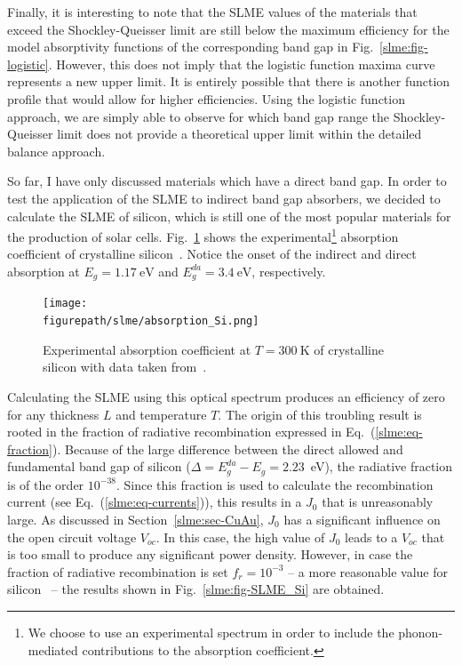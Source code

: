 \begin{refsection}
Finally, it is interesting to note that the SLME values of the materials that 
exceed the Shockley-Queisser limit are still below the maximum efficiency for 
the model absorptivity functions of the corresponding band gap in 
Fig.~\ref{slme:fig-logistic}. However, this does not imply that the logistic 
function maxima curve represents a new upper limit. It is entirely possible 
that there is another function profile that would allow for higher 
efficiencies. Using the logistic function approach, we are simply able to 
observe for which band gap range the Shockley-Queisser limit does not provide 
a theoretical upper limit within the detailed balance approach. 
 
 
So far, I have only discussed materials which have a direct band gap. In 
order to test the application of the SLME to indirect band gap absorbers, we 
decided to calculate the SLME of silicon, which is still one of the most 
popular materials for the production of solar cells. 
Fig.~\ref{slme:fig-Si_expAbs} shows the experimental\footnote{We choose to 
use an experimental spectrum in order to include the phonon-mediated 
contributions to the absorption coefficient.} absorption coefficient of 
crystalline silicon~\cite{green2008}. Notice the onset of the indirect and 
direct absorption at \mbox{$E_g = 1.17~\si{\electronvolt}$} and 
\mbox{$E_g^{da} = 3.4~\si{\electronvolt}$}, respectively. 

\begin{figure}[ht] 
\centering 
\captionsetup{width=0.9\textwidth}
\texttt{[image: \\figurepath/slme/absorption\_Si.png]} 
\caption{Experimental absorption coefficient at $T = 300~\si{\kelvin}$ of 
crystalline silicon with data taken from~\cite{green2008}.} 
\label{slme:fig-Si_expAbs} 
\end{figure} 

Calculating the SLME using this optical spectrum produces an efficiency of 
zero for any thickness $L$ and temperature $T$. The origin of this troubling result is 
rooted in the fraction of radiative recombination expressed in 
Eq.~(\ref{slme:eq-fraction}). Because of the large difference between the 
direct allowed and fundamental band gap of silicon ($\Delta = 
E_g^{da}-E_g=2.23$~\si{\electronvolt}), the radiative fraction is of the order 
$10^{-38}$. Since this fraction is used to calculate the recombination 
current (see Eq.~(\ref{slme:eq-currents})), this results in a $J_0$ that is 
unreasonably large. As discussed in Section~\ref{slme:sec-CuAu}, $J_0$ has a 
significant influence on the open circuit voltage $V_{oc}$. In this case, the 
high value of $J_0$ leads to a $V_{oc}$ that is too small to produce any 
significant power density. However, in case the fraction of radiative recombination is set \mbox{$f_r = 10^{-3}$} -- a 
more reasonable value for silicon~\cite{Shockley1952,Trupke2003,Richter2012} -- the results shown in Fig.~\ref{slme:fig-SLME_Si} are obtained. 
 

\end{refsection}
